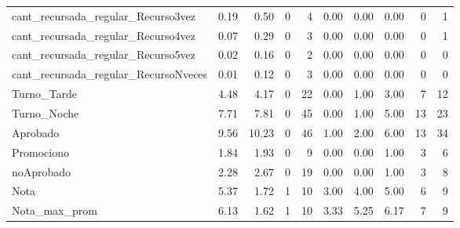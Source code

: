 \begin{table}[!h]
{\begin{tabular}[t]{lrrrrrrrrr}
			\rowcolor{gray!6}  cant\_recursada\_regular\_Recurso3vez & 0.19 & 0.50 & 0 & 4 & 0.00 & 0.00 & 0.00 & 0 & 1\\
			cant\_recursada\_regular\_Recurso4vez & 0.07 & 0.29 & 0 & 3 & 0.00 & 0.00 & 0.00 & 0 & 1\\
			\rowcolor{gray!6}  cant\_recursada\_regular\_Recurso5vez & 0.02 & 0.16 & 0 & 2 & 0.00 & 0.00 & 0.00 & 0 & 0\\
			\addlinespace
			cant\_recursada\_regular\_RecursoNveces & 0.01 & 0.12 & 0 & 3 & 0.00 & 0.00 & 0.00 & 0 & 0\\
			\rowcolor{gray!6}  Turno\_Tarde & 4.48 & 4.17 & 0 & 22 & 0.00 & 1.00 & 3.00 & 7 & 12\\
			Turno\_Noche & 7.71 & 7.81 & 0 & 45 & 0.00 & 1.00 & 5.00 & 13 & 23\\
			\rowcolor{gray!6}  Aprobado & 9.56 & 10.23 & 0 & 46 & 1.00 & 2.00 & 6.00 & 13 & 34\\
			Promociono & 1.84 & 1.93 & 0 & 9 & 0.00 & 0.00 & 1.00 & 3 & 6\\
			\addlinespace
			\rowcolor{gray!6}  noAprobado & 2.28 & 2.67 & 0 & 19 & 0.00 & 0.00 & 1.00 & 3 & 8\\
			Nota & 5.37 & 1.72 & 1 & 10 & 3.00 & 4.00 & 5.00 & 6 & 9\\
			\rowcolor{gray!6}  Nota\_max\_prom & 6.13 & 1.62 & 1 & 10 & 3.33 & 5.25 & 6.17 & 7 & 9\\
			\bottomrule
	\end{tabular}}
\end{table}